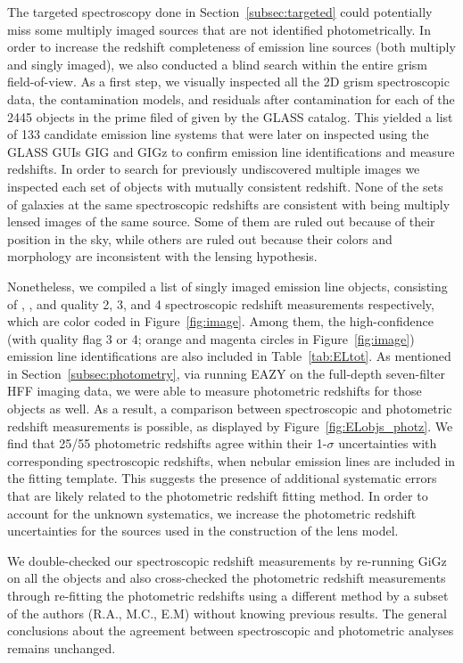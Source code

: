 The targeted spectroscopy done in Section~\ref{subsec:targeted} could
potentially miss some multiply imaged sources that are not identified
photometrically. In order to increase the redshift completeness of
emission line sources (both multiply and singly imaged), we also
conducted a blind search within the entire grism field-of-view. As a
first step, we visually inspected all the 2D grism
spectroscopic data, the contamination models, and residuals after
contamination for each of the 2445 objects in the prime filed of \cler
given by the GLASS catalog.  This yielded a list of 133 candidate
emission line systems that were later on inspected using the GLASS
GUIs GIG and GIGz to confirm emission
line identifications and measure redshifts.  In order to search for
previously undiscovered multiple images we inspected each set of
objects with mutually consistent redshift.  None of the sets of
galaxies at the same spectroscopic redshifts are consistent with being
multiply lensed images of the same source. Some of them are ruled out
because of their position in the sky, while others are ruled out
because their colors and morphology are inconsistent with the lensing
hypothesis.

Nonetheless, we compiled a list of singly imaged emission line
objects, consisting of \NELQtwo{}, \NELQthree{}, and \NELQfour{}
quality 2, 3, and 4 spectroscopic redshift measurements respectively,
which are color coded in Figure~\ref{fig:image}. Among them, the
high-confidence (with quality flag 3 or 4; orange and magenta circles
in Figure~\ref{fig:image}) emission line identifications are also
included in Table~\ref{tab:ELtot}. As mentioned in
Section~\ref{subsec:photometry}, via running EAZY on the full-depth
seven-filter HFF imaging data, we were able to measure photometric
redshifts for those objects as well. As a result, a comparison between
spectroscopic and photometric redshift measurements is possible, as
displayed by Figure~\ref{fig:ELobjs_photz}. We find that 25/55
photometric redshifts agree within their 1-$\sigma$ uncertainties with
corresponding spectroscopic redshifts, when nebular emission lines are
included in the fitting template. This suggests the presence of
additional systematic errors that are likely related to the
photometric redshift fitting method. In order to account for the
unknown systematics, we increase the photometric redshift
uncertainties for the sources used in the construction of the lens
model.

We double-checked our spectroscopic redshift measurements by
re-running GiGz on all the objects and also cross-checked the photometric
redshift measurements through re-fitting the photometric redshifts
using a different method by a subset of the authors (R.A., M.C., E.M)
without knowing previous results. The general conclusions about the
agreement between spectroscopic and photometric analyses remains
unchanged.

